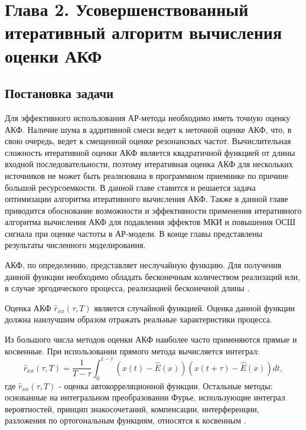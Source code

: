 \setcounter{chapter}{2}
\setcounter{section}{0}
\setcounter{equation}{0}
\setcounter{figure}{0}
\chapter*{Глава 2. Усовершенствованный итеративный алгоритм вычисления оценки АКФ}
\label{l:sec_acf}

\section{Постановка задачи}

Для эффективного использования АР-метода необходимо иметь точную оценку АКФ. Наличие шума в аддитивной смеси ведет к неточной
оценке АКФ, что, в свою очередь, ведет к смещенной оценке резонансных частот. Вычислительная сложность итеративной оценки АКФ является квадратичной
функцией от длины входной последовательности, поэтому итеративная оценка АКФ для нескольких источников не может быть реализована в программном приемнике
по причине большой ресурсоемкости. В данной главе ставится и решается задача оптимизации алгоритма итеративного вычисления АКФ. Также в данной
главе приводится обоснование возможности и эффективности применения итеративного алгоритма вычисления АКФ для подавления эффектов МКИ и повышения ОСШ сигнала
при оценке частоты в АР-модели. В конце главы представлены результаты численного моделирования.

АКФ, по определению, представляет неслучайную функцию.
Для получения данной функции необходимо обладать бесконечным количеством реализаций или, в случае эргодического процесса, реализацией бесконечной длины \cite{bolshakov-book}.

Оценка АКФ ${\hat{r}_{xx}(\tau, T)}$ является случайной функцией. Оценка данной функции должна наилучшим образом отражать реальные характеристики процесса.

Из большого числа методов оценки АКФ наиболее часто применяются прямые и косвенные. При использовании прямого метода вычисляется интеграл:
\begin{equation}
	\label{eq:acf_integral_basic}
	\hat{r}_{xx}(\tau, T) = \frac{1}{T-\tau} \int_{0}^{t-\tau} (x(t) - \hat{E}(x))(x(t+\tau) - \hat{E}(x))dt,
\end{equation}
где ${\hat{r}_{xx}(\tau, T)}$ -  оценка автокорреляционной функции. Остальные методы: основанные на интегральном преобразовании Фурье, использующие интеграл вероятностей, принцип
знакосочетаний, компенсации, интерференции, разложения по ортогональным функциям, относятся к косвенным \cite{bolshakov-book}.

